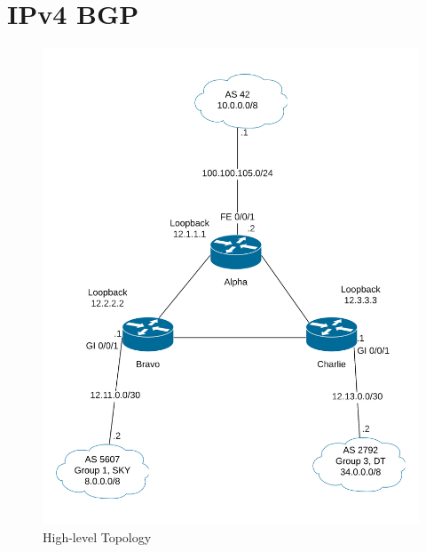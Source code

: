\section{IPv4 BGP}
\begin{figure}[!ht]
	\caption{High-level Topology}
	\centering
	\includegraphics[width=\textwidth]{images/IPv4BGPPeers.png}
\end{figure}
\clearpage